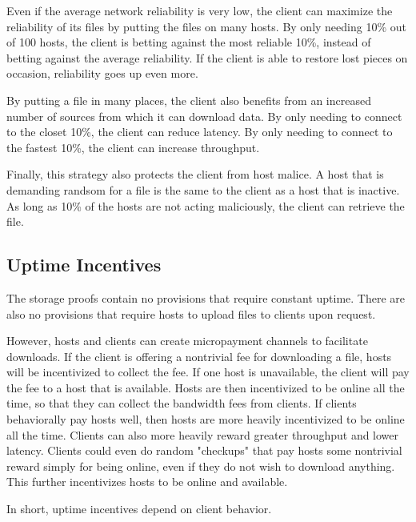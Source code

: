 \documentclass[twocolumn]{article}
\begin{document}
Even if the average network reliability is very low, the client can maximize the reliability of its files by putting the files on many hosts.
By only needing 10\% out of 100 hosts, the client is betting against the most reliable 10\%, instead of betting against the average reliability.
If the client is able to restore lost pieces on occasion, reliability goes up even more.

By putting a file in many places, the client also benefits from an increased number of sources from which it can download data.
By only needing to connect to the closet 10\%, the client can reduce latency.
By only needing to connect to the fastest 10\%, the client can increase throughput.

Finally, this strategy also protects the client from host malice.
A host that is demanding randsom for a file is the same to the client as a host that is inactive.
As long as 10\% of the hosts are not acting maliciously, the client can retrieve the file.

\subsection{Uptime Incentives}
The storage proofs contain no provisions that require constant uptime.
There are also no provisions that require hosts to upload files to clients upon request.

However, hosts and clients can create micropayment channels to facilitate downloads.
If the client is offering a nontrivial fee for downloading a file, hosts will be incentivized to collect the fee.
If one host is unavailable, the client will pay the fee to a host that is available.
Hosts are then incentivized to be online all the time, so that they can collect the bandwidth fees from clients.
If clients behaviorally pay hosts well, then hosts are more heavily incentivized to be online all the time.
Clients can also more heavily reward greater throughput and lower latency.
Clients could even do random "checkups" that pay hosts some nontrivial reward simply for being online, even if they do not wish to download anything.
This further incentivizes hosts to be online and available.

In short, uptime incentives depend on client behavior.

\end{document}
